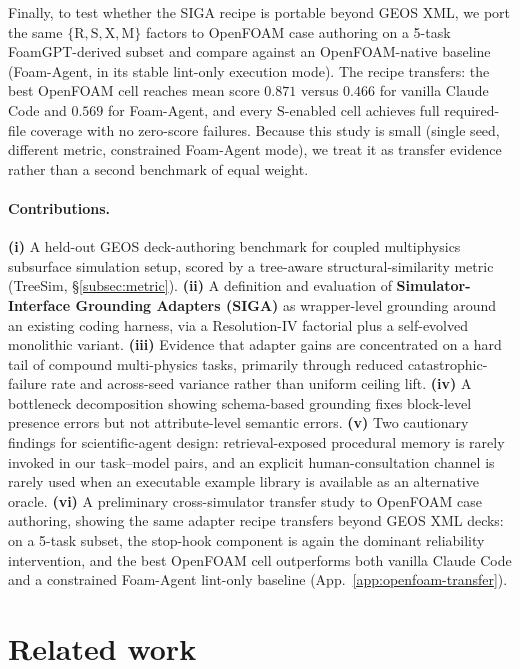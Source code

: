 \documentclass{article}
\begin{document}
Finally, to test whether the SIGA recipe is portable beyond GEOS XML, we port the same $\{\mathrm{R,S,X,M}\}$ factors to OpenFOAM case authoring on a 5-task FoamGPT-derived subset and compare against an OpenFOAM-native baseline (Foam-Agent, in its stable lint-only execution mode). The recipe transfers: the best OpenFOAM cell reaches mean score $0.871$ versus $0.466$ for vanilla Claude Code and $0.569$ for Foam-Agent, and every $\mathrm{S}$-enabled cell achieves full required-file coverage with no zero-score failures. Because this study is small (single seed, different metric, constrained Foam-Agent mode), we treat it as transfer evidence rather than a second benchmark of equal weight.

\paragraph{Contributions.}
\textbf{(i)} A held-out GEOS deck-authoring benchmark for coupled multiphysics subsurface simulation setup, scored by a tree-aware structural-similarity metric (TreeSim, \S\ref{subsec:metric}).
\textbf{(ii)} A definition and evaluation of \textbf{Simulator-Interface Grounding Adapters (SIGA)} as wrapper-level grounding around an existing coding harness, via a Resolution-IV factorial plus a self-evolved monolithic variant.
\textbf{(iii)} Evidence that adapter gains are concentrated on a hard tail of compound multi-physics tasks, primarily through reduced catastrophic-failure rate and across-seed variance rather than uniform ceiling lift.
\textbf{(iv)} A bottleneck decomposition showing schema-based grounding fixes block-level presence errors but not attribute-level semantic errors.
\textbf{(v)} Two cautionary findings for scientific-agent design: retrieval-exposed procedural memory is rarely invoked in our task--model pairs, and an explicit human-consultation channel is rarely used when an executable example library is available as an alternative oracle.
\textbf{(vi)} A preliminary cross-simulator transfer study to OpenFOAM case authoring, showing the same adapter recipe transfers beyond GEOS XML decks: on a 5-task subset, the stop-hook component is again the dominant reliability intervention, and the best OpenFOAM cell outperforms both vanilla Claude Code and a constrained Foam-Agent lint-only baseline (App.~\ref{app:openfoam-transfer}).

\section{Related work}
\label{sec:related}
\end{document}
